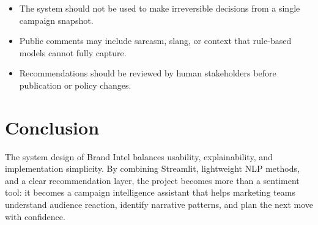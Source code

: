 \begin{itemize}
    \item The system should not be used to make irreversible decisions from a single campaign snapshot.
    \item Public comments may include sarcasm, slang, or context that rule-based models cannot fully capture.
    \item Recommendations should be reviewed by human stakeholders before publication or policy changes.
\end{itemize}

\section{Conclusion}
The system design of Brand Intel balances usability, explainability, and implementation simplicity. By combining Streamlit, lightweight NLP methods, and a clear recommendation layer, the project becomes more than a sentiment tool: it becomes a campaign intelligence assistant that helps marketing teams understand audience reaction, identify narrative patterns, and plan the next move with confidence.
